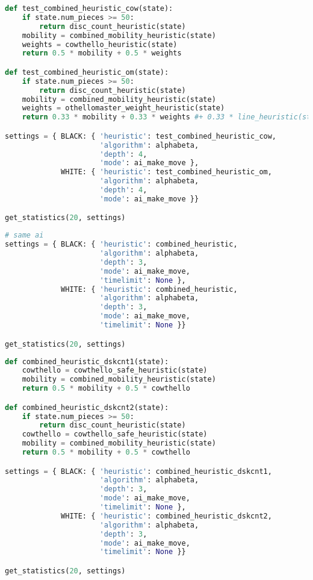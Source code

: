 \begin{lstlisting}[language=Python]
def test_combined_heuristic_cow(state):
    if state.num_pieces >= 50:
        return disc_count_heuristic(state)
    mobility = combined_mobility_heuristic(state)
    weights = cowthello_heuristic(state)
    return 0.5 * mobility + 0.5 * weights

def test_combined_heuristic_om(state):
    if state.num_pieces >= 50:
        return disc_count_heuristic(state)
    mobility = combined_mobility_heuristic(state)
    weights = othellomaster_weight_heuristic(state)
    return 0.33 * mobility + 0.33 * weights #+ 0.33 * line_heuristic(state)

settings = { BLACK: { 'heuristic': test_combined_heuristic_cow,
                      'algorithm': alphabeta,
                      'depth': 4,
                      'mode': ai_make_move },
             WHITE: { 'heuristic': test_combined_heuristic_om,
                      'algorithm': alphabeta,
                      'depth': 4,
                      'mode': ai_make_move }}

get_statistics(20, settings)
\end{lstlisting}

\begin{lstlisting}[language=Python]
# same ai
settings = { BLACK: { 'heuristic': combined_heuristic,
                      'algorithm': alphabeta,
                      'depth': 3,
                      'mode': ai_make_move,
                      'timelimit': None },
             WHITE: { 'heuristic': combined_heuristic,
                      'algorithm': alphabeta,
                      'depth': 3,
                      'mode': ai_make_move,
                      'timelimit': None }}

get_statistics(20, settings)
\end{lstlisting}

\begin{lstlisting}[language=Python]
def combined_heuristic_dskcnt1(state):
    cowthello = cowthello_safe_heuristic(state)
    mobility = combined_mobility_heuristic(state)
    return 0.5 * mobility + 0.5 * cowthello

def combined_heuristic_dskcnt2(state):
    if state.num_pieces >= 50:
        return disc_count_heuristic(state)
    cowthello = cowthello_safe_heuristic(state)
    mobility = combined_mobility_heuristic(state)
    return 0.5 * mobility + 0.5 * cowthello

settings = { BLACK: { 'heuristic': combined_heuristic_dskcnt1,
                      'algorithm': alphabeta,
                      'depth': 3,
                      'mode': ai_make_move,
                      'timelimit': None },
             WHITE: { 'heuristic': combined_heuristic_dskcnt2,
                      'algorithm': alphabeta,
                      'depth': 3,
                      'mode': ai_make_move,
                      'timelimit': None }}

get_statistics(20, settings)
\end{lstlisting}
